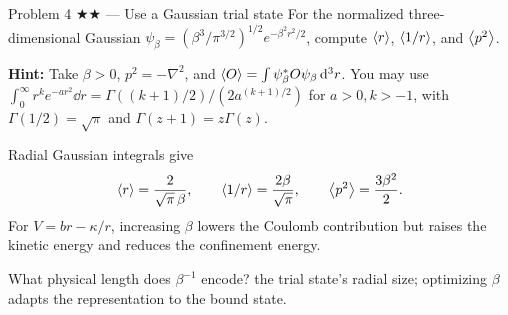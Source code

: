 \documentclass[11pt]{article}
\begin{document}
\begin{problem}{Problem 4 ★★ — Use a Gaussian trial state}
For the normalized three-dimensional Gaussian
$\psi_\beta=(\beta^3/\pi^{3/2})^{1/2}e^{-\beta^2r^2/2}$, compute
$\left\langle r\right\rangle$, $\left\langle 1/r\right\rangle$, and $\left\langle p^2\right\rangle$.

\textbf{Hint:} Take $\beta>0$, $p^2=-\nabla^2$, and
$\left\langle O\right\rangle=\int\psi_\beta^*O\psi_\beta\,\mathrm d^3r$.
You may use $\int_0^\infty r^k e^{-ar^2}\dd r=
\Gamma((k+1)/2)/(2a^{(k+1)/2})$ for $a>0,k>-1$, with
$\Gamma(1/2)=\sqrt\pi$ and $\Gamma(z+1)=z\Gamma(z)$.
\end{problem}
\begin{solution}
Radial Gaussian integrals give
\[
\left\langle r\right\rangle=\frac{2}{\sqrt\pi\,\beta},\qquad
\left\langle 1/r\right\rangle=\frac{2\beta}{\sqrt\pi},\qquad
\left\langle p^2\right\rangle=\frac{3\beta^2}{2}.
\]
For $V=br-\kappa/r$, increasing $\beta$ lowers the Coulomb contribution but
raises the kinetic energy and reduces the confinement energy.
\end{solution}
\begin{quiz}
What physical length does $\beta^{-1}$ encode? \answer the trial state's radial
size; optimizing $\beta$ adapts the representation to the bound state.
\end{quiz}
\end{document}
